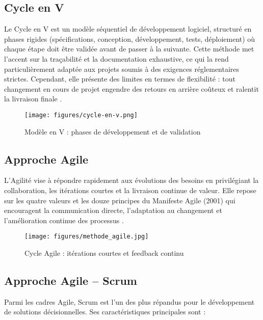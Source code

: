 \documentclass[12pt,a4paper]{report}
\begin{document}
\subsection{Cycle en V}
Le Cycle en V est un modèle séquentiel de développement logiciel, structuré en phases rigides (spécifications, conception, développement, tests, déploiement) où chaque étape doit être validée avant de passer à la suivante. Cette méthode met l’accent sur la traçabilité et la documentation exhaustive, ce qui la rend particulièrement adaptée aux projets soumis à des exigences réglementaires strictes. Cependant, elle présente des limites en termes de flexibilité : tout changement en cours de projet engendre des retours en arrière coûteux et ralentit la livraison finale \cite{Royce1970}.  
\begin{figure}[H]
  \centering
  \texttt{[image: figures/cycle-en-v.png]}
  \caption{Modèle en V : phases de développement et de validation}
  \label{fig:cycle_en_v}
\end{figure}

\subsection{Approche Agile}
L’Agilité vise à répondre rapidement aux évolutions des besoins en privilégiant la collaboration, les itérations courtes et la livraison continue de valeur. Elle repose sur les quatre valeurs et les douze principes du Manifeste Agile (2001) qui encouragent la communication directe, l’adaptation au changement et l’amélioration continue des processus \cite{Beck2001}.  
\begin{figure}[H]
  \centering
  \texttt{[image: figures/methode\_agile.jpg]}
  \caption{Cycle Agile : itérations courtes et feedback continu}
  \label{fig:cycle_agile}
\end{figure}

\subsection{Approche Agile – Scrum}
Parmi les cadres Agile, Scrum est l’un des plus répandus pour le développement de solutions décisionnelles. Ses caractéristiques principales sont :
\end{document}
